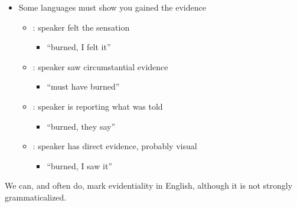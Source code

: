 \documentclass[headrule,footrule]{foils}
\begin{document}
\begin{itemize}
\item  Some languages must show you gained the evidence
\begin{itemize}\addtolength{\itemsep}{1.5ex}
\item  {}:  speaker felt the sensation
  \begin{itemize}
  \item {} ``burned, I felt it''
  \end{itemize}
\item  {}: speaker saw circumstantial evidence 
  \begin{itemize}
  \item  {}  ``must have burned''
  \end{itemize}
\item  {}:   speaker is reporting what was told
  \begin{itemize}
  \item  {} ``burned, they say''
  \end{itemize}
\item  {}:   speaker has direct evidence, probably visual 
  \begin{itemize}
  \item {} ``burned, I saw it''
  \end{itemize}
\end{itemize}
\end{itemize}


We can, and often do, mark evidentiality in English, although it is
not strongly grammaticalized.

\begin{exe}
\ex {}
\ex {}
\ex {}
\ex {}
\ex {}
\ex {}
\ex {}
\end{exe}
\end{document}
